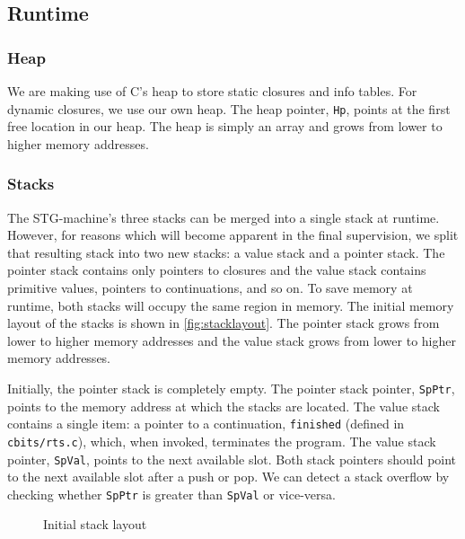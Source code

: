 \subsection{Runtime}
\label{app:runtime}

\subsubsection{Heap}
\label{app:heap}

We are making use of C's heap to store static closures and info tables. For dynamic closures, we use our own heap. The heap pointer, \texttt{Hp}, points at the first free location in our heap. The heap is simply an array and grows from lower to higher memory addresses.

\subsubsection{Stacks}
\label{app:stacks}

The STG-machine's three stacks can be merged into a single stack at runtime. However, for reasons which will become apparent in the final supervision, we split that resulting stack into two new stacks: a value stack and a pointer stack. The pointer stack contains only pointers to closures and the value stack contains primitive values, pointers to continuations, and so on. To save memory at runtime, both stacks will occupy the same region in memory. The initial memory layout of the stacks is shown in \autoref{fig:stacklayout}. The pointer stack grows from lower to higher memory addresses and the value stack grows from lower to higher memory addresses. 

Initially, the pointer stack is completely empty. The pointer stack pointer, \texttt{SpPtr}, points to the memory address at which the stacks are located. The value stack contains a single item: a pointer to a continuation, \texttt{finished} (defined in \texttt{cbits/rts.c}), which, when invoked, terminates the program. The value stack pointer, \texttt{SpVal}, points to the next available slot. Both stack pointers should point to the next available slot after a push or pop. We can detect a stack overflow by checking whether \texttt{SpPtr} is greater than \texttt{SpVal} or vice-versa.

\begin{figure}
\begin{center}
\begin{drawstack}
  \cell{\texttt{}} 
  \cell{} 
\end{drawstack}
\caption{Initial stack layout}
\label{fig:stacklayout}
\end{center}
\end{figure}



